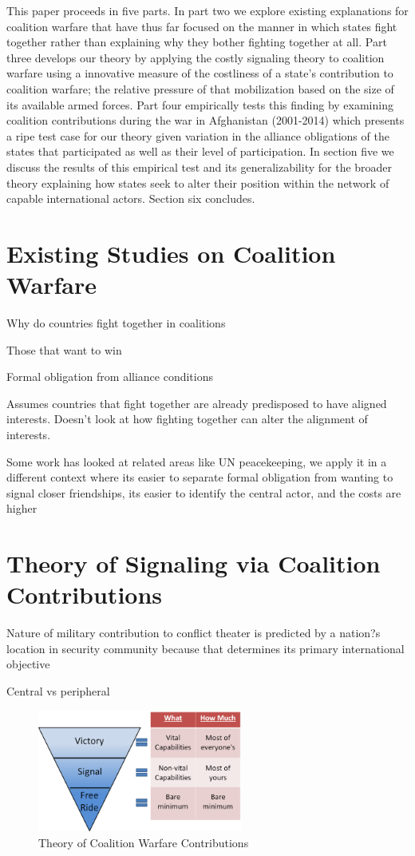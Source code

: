 \documentclass[12pt,letterpaper]{article}
\begin{document}
	This paper proceeds in five parts. In part two we explore existing explanations for coalition warfare that have thus far focused on the manner in which states fight together rather than explaining why they bother fighting together at all. Part three develops our theory by applying the costly signaling theory to coalition warfare using a innovative measure of the costliness of a state's contribution to coalition warfare; the relative pressure of that mobilization based on the size of its available armed forces. Part four empirically tests this finding by examining coalition contributions during the war in Afghanistan (2001-2014) which presents a ripe test case for our theory given variation in the alliance obligations of the states that participated as well as their level of participation. In section five we discuss the results of this empirical test and its generalizability for the broader theory explaining how states seek to alter their position within the network of capable international actors. Section six concludes.

\section{Existing Studies on Coalition Warfare}
	Why do countries fight together in coalitions
	
	Those that want to win
	
	Formal obligation from alliance conditions
	
	Assumes countries that fight together are already predisposed to have aligned interests. Doesn't look at how fighting together can alter the alignment of interests.
	
	Some work has looked at related areas like UN peacekeeping, we apply it in a different context where its easier to separate formal obligation from wanting to signal closer friendships, its easier to identify the central actor, and the costs are higher

\section{Theory of Signaling via Coalition Contributions}
	Nature of military contribution to conflict theater is predicted by a nation?s location in security community because that determines its primary international objective
	
	Central vs peripheral
		\begin{figure}[H]
			\centering
			\includegraphics[width=0.6\textwidth]{contribution_pyramid.png}
			\caption{Theory of Coalition Warfare Contributions}
			\label{fig:theory}
		\end{figure}			
\end{document}
